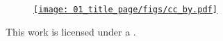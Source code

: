 \begin{titlepage}
  \vspace{\fill}

  \begin{center}
    \begin{figure}[h]
      \centering
      \href{\TheLicenseURL}{\texttt{[image: 
          01\_title\_page/figs/cc\_by.pdf]}}
    \end{figure}

    This work is licensed under a \href{\TheLicenseURL}{\TheLicense{}}.
  \end{center}
\end{titlepage}
